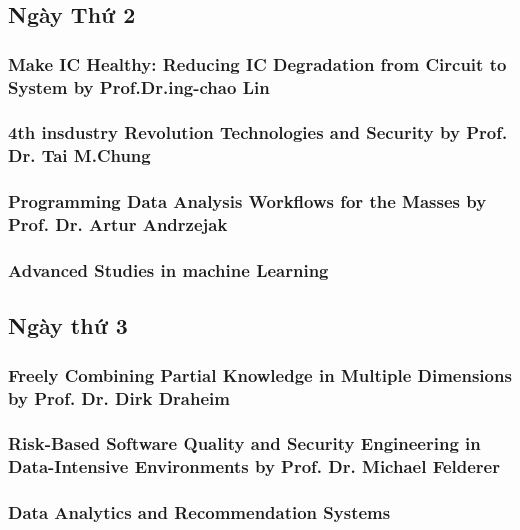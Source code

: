 \documentclass{hcmutarticle}
\begin{document}
\subsection{Ngày Thứ 2}
\subsubsection{Make IC Healthy: Reducing IC Degradation from Circuit to System by Prof.Dr.ing-chao Lin}
\subsubsection{4th insdustry Revolution Technologies and Security by Prof. Dr. Tai M.Chung}
\subsubsection{Programming Data Analysis Workflows for the Masses by Prof. Dr. Artur Andrzejak}
\subsubsection{Advanced Studies in machine Learning}

\subsection{Ngày thứ 3}
\subsubsection{Freely Combining Partial Knowledge in Multiple Dimensions
by Prof. Dr. Dirk Draheim}
\subsubsection{Risk-Based Software Quality and Security Engineering in Data-Intensive Environments
by Prof. Dr. Michael Felderer}
\subsubsection{ Data Analytics and Recommendation Systems}
\end{document}
